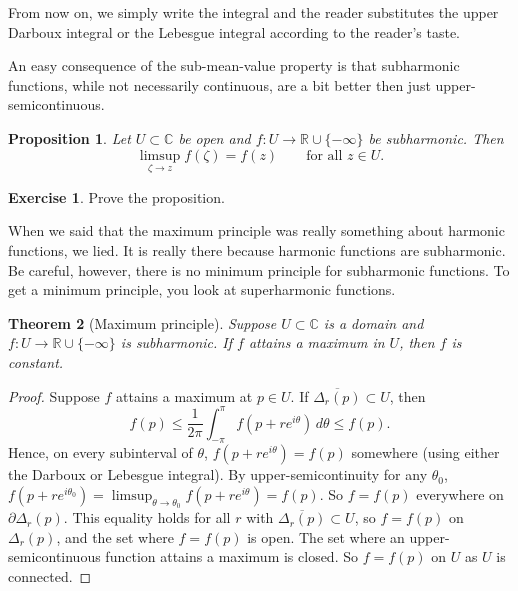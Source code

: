 \documentclass[12pt,openany]{book}
\newcommand{\C}{{\mathbb{C}}}
\newcommand{\R}{{\mathbb{R}}}
\theoremstyle{plain}
\newtheorem{thm}{Theorem}[section]
\newtheorem{prop}[thm]{Proposition}
\theoremstyle{remark}
\theoremstyle{definition}
\newenvironment{exbox}{%
    \def\FrameCommand{\vrule width 1pt \relax\hspace{10pt}}%
    \MakeFramed{\advance\hsize-\width\FrameRestore}%
}{%
    \endMakeFramed
}
\theoremstyle{exercise}
\newtheorem{exercise}{Exercise}[section]
\theoremstyle{example}
\begin{document}
From now on, we simply write the integral and
the reader substitutes the upper Darboux integral or the Lebesgue integral
according to the reader's taste.

An easy consequence of the sub-mean-value property is that subharmonic
functions, while not necessarily continuous, are a bit better then just
upper-semicontinuous.

\begin{prop}
Let $U \subset \C$ be open and
$f \colon U \to \R \cup\{- \infty \}$ be subharmonic.
Then 
\begin{equation*}
\limsup_{\zeta \to z} f(\zeta) = f(z) 
\qquad \text{for all $z \in U$.}
\end{equation*}
\end{prop}

\begin{exbox}
\begin{exercise}
Prove the proposition.
\end{exercise}
\end{exbox}

When we said that the maximum principle was really something about harmonic
functions, we lied.  It is really there because harmonic functions are
subharmonic.  Be careful, however, there is no minimum principle for
subharmonic functions.  To get a minimum principle, you look at superharmonic
functions.

\begin{thm}[Maximum principle]
Suppose $U \subset \C$ is a domain and $f \colon U \to \R \cup \{ -\infty \}$
is subharmonic.  If $f$ attains a maximum in $U$, then $f$ is constant.
\end{thm}

\begin{proof}
Suppose $f$ attains a maximum at $p \in U$.
If
$\overline{\Delta_r(p)} \subset U$, then
\begin{equation*}
f(p) \leq \frac{1}{2\pi} \int_{-\pi}^{\pi} f(p+re^{i\theta})\, d\theta \leq f(p)
.
\end{equation*}
Hence, on every subinterval of $\theta$, $f(p+re^{i\theta}) = f(p)$
somewhere (using either the Darboux or Lebesgue integral).
By upper-semicontinuity for any $\theta_0$,
$f(p+re^{i\theta_0}) = \limsup_{\theta \to \theta_0} f(p+re^{i\theta}) =
f(p)$.  So $f = f(p)$ everywhere on $\partial \Delta_r(p)$.
This equality holds for all $r$
with $\overline{\Delta_r(p)} \subset U$, so $f=f(p)$ on $\Delta_r(p)$,
and the set where $f=f(p)$ is open.  The set where an upper-semicontinuous
function attains a maximum is closed.  So $f=f(p)$ on $U$ as $U$ is
connected.
\end{proof}
\end{document}
